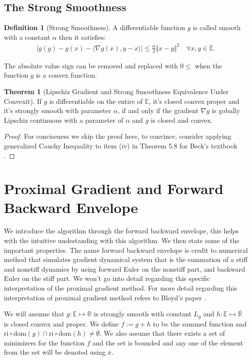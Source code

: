 \documentclass[]{article}
\theoremstyle{definition}
\newtheorem{theorem}{Theorem}       %
\newtheorem{definition}{Definition}
\begin{document}
    \subsection{The Strong Smoothness}
        \begin{definition}[Strong Smoothness]\label{def:strong_smoothness}
            A differentiable function $g$ is called smooth with a constant $\alpha$ then it satisfies: 
            \begin{align}
                |g(y) - g(x) - 
                \langle \nabla g(x), y - x
                \rangle| \le \frac{\alpha}{2}\Vert x - y\Vert^2
                \quad \forall x, y\in \mathbb E. 
            \end{align}    
        \end{definition}
        The absolute value sign can be removed and replaced with $0\le$ when the function $g$ is a convex function.
        \begin{theorem}[Lipschiz Gradient and Strong Smoothness Equivalence Under Convexit]\label{thm:cvx_lipz_grad}
            If $g$ is differentiable on the entire of $\mathbb E$, it's closed convex proper and it's strongly smooth with parameter $\alpha$, if and only if the gradient $\nabla g$ is gobally Lipschiz continuous with a parameter of $\alpha$ and $g$ is closed and convex. 
        \end{theorem}
        \begin{proof}
            For conciseness we skip the proof here, to convince, consider applying generalized Cauchy Inequality to item (iv) in Theorem 5.8 for Beck's textbook \cite{paper:FISTA}. 
        \end{proof}
        
\section{Proximal Gradient and Forward Backward Envelope}\label{sec:pg_forward_backward_env}
    We introduce the algorithm through the forward backward envelope, this helps with the intuitive undestanding with this algorithm. We then state some of the important properties. The name forward backward envelope is credit to numerical method that simulates gradient dynamical system that is the summation of a stiff and nonstiff dynamics by using forward Euler on the nonstiff part, and backward Euler on the stiff part. We won't go into detail regarding this specific interpretation of the proximal gradient method. For more detail regarding this interpretation of proximal gradient method refers to Bloyd's paper \cite{paper:bloyd}. 
    \begin{assumption}\label{assumption:1}
        We will assume that $g:\mathbb E\mapsto \mathbb R$ is strongly smooth with constant $L_g$ and $h:\mathbb E \mapsto \bar{\mathbb R}$ is closed convex and proper. We define $f := g + h$ to be the summed function and $\text{ri}\circ \text{dom}(g) \cap \text{ri}\circ \text{dom}(h) \neq \emptyset$. We also assume that there exists a set of minimizers for the function $f$ and the set is bounded and any one of the element from the set will be denoted using $\bar x$. 
    \end{assumption}
    
\end{document}
